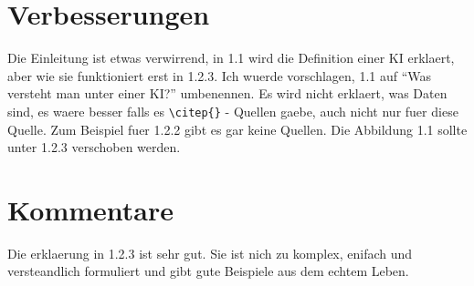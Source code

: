 \documentclass{article}
\begin{document}
\section{Verbesserungen}
Die Einleitung ist etwas verwirrend, in 1.1 wird die Definition einer KI erklaert, aber wie sie funktioniert erst in 1.2.3. Ich wuerde vorschlagen, 1.1 auf \enquote{Was versteht man unter einer KI?} umbenennen. 
\newline
\newline
Es wird nicht erklaert, was Daten sind, es waere besser falls es \verb|\citep{}| - Quellen gaebe, auch nicht nur fuer diese Quelle. Zum Beispiel fuer 1.2.2 gibt es gar keine Quellen.
\newline
\newline
Die Abbildung 1.1 sollte unter 1.2.3 verschoben werden.

\section{Kommentare}
Die erklaerung in 1.2.3 ist sehr gut. Sie ist nich zu komplex, enifach und versteandlich formuliert und gibt gute Beispiele aus dem echtem Leben.

\printbibliography
\end{document}
